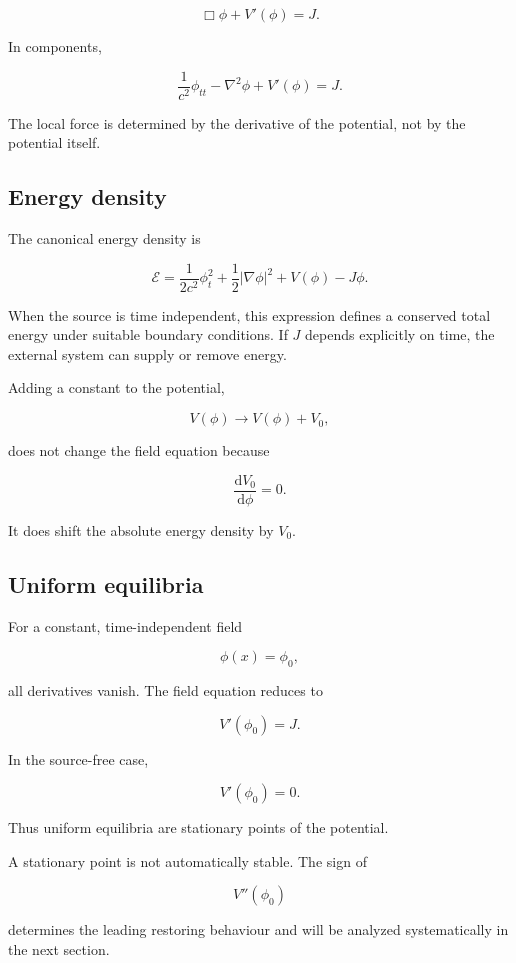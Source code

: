\[
\boxed{
\Box\phi
+
V'(\phi)
=
J
}.
\]

In components,

\[
\boxed{
\frac{1}{c^{2}}\phi_{tt}
-
\nabla^{2}\phi
+
V'(\phi)
=
J
}.
\]

The local force is determined by the derivative of the potential, not by the potential itself.

\subsection{Energy density}

The canonical energy density is

\[
\boxed{
\mathcal{E}
=
\frac{1}{2c^{2}}
\phi_{t}^{2}
+
\frac{1}{2}
|\nabla\phi|^{2}
+
V(\phi)
-
J\phi
}.
\]

When the source is time independent, this expression defines a conserved total energy under suitable boundary conditions. If \(J\) depends explicitly on time, the external system can supply or remove energy.

Adding a constant to the potential,

\[
V(\phi)
\longrightarrow
V(\phi)+V_{0},
\]

does not change the field equation because

\[
\frac{\mathrm{d}V_{0}}{\mathrm{d}\phi}=0.
\]

It does shift the absolute energy density by \(V_{0}\).

\subsection{Uniform equilibria}

For a constant, time-independent field

\[
\phi(x)=\phi_{0},
\]

all derivatives vanish. The field equation reduces to

\[
\boxed{
V'(\phi_{0})=J
}.
\]

In the source-free case,

\[
\boxed{
V'(\phi_{0})=0
}.
\]

Thus uniform equilibria are stationary points of the potential.

A stationary point is not automatically stable. The sign of

\[
V''(\phi_{0})
\]

determines the leading restoring behaviour and will be analyzed systematically in the next section.

